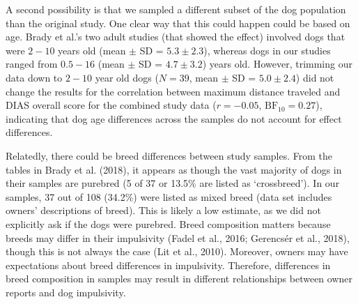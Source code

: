 \documentclass[
  pub,floatsintext]{apa6}
\begin{document}
A second possibility is that we sampled a different subset of the dog population than the original study. One clear way that this could happen could be based on age. Brady et al.'s two adult studies (that showed the effect) involved dogs that were \(2-10\) years old (mean \(\pm\) SD = \(5.3 \pm 2.3\)), whereas dogs in our studies ranged from \(0.5-16\) (mean \(\pm\) SD = \(4.7 \pm 3.2\)) years old. However, trimming our data down to \(2-10\) year old dogs (\(N = 39\), mean \(\pm\) SD = \(5.0 \pm 2.4\)) did not change the results for the correlation between maximum distance traveled and DIAS overall score for the combined study data (\(r = -0.05\), \(\mathrm{BF}_{\textrm{10}} = 0.27\)), indicating that dog age differences across the samples do not account for effect differences.

Relatedly, there could be breed differences between study samples. From the tables in Brady et al. (2018), it appears as though the vast majority of dogs in their samples are purebred (5 of 37 or 13.5\% are listed as `crossbreed'). In our samples, 37 out of 108 (34.2\%) were listed as mixed breed (data set includes owners' descriptions of breed). This is likely a low estimate, as we did not explicitly ask if the dogs were purebred. Breed composition matters because breeds may differ in their impulsivity (Fadel et al., 2016; Gerencsér et al., 2018), though this is not always the case (Lit et al., 2010). Moreover, owners may have expectations about breed differences in impulsivity. Therefore, differences in breed composition in samples may result in different relationships between owner reports and dog impulsivity.
\end{document}
